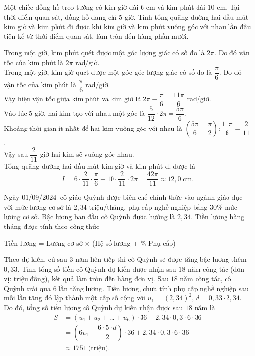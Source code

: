 \begin{ex}%
Một chiếc đồng hồ treo tường có kim giờ dài $6$ cm và kim phút dài $10$ cm. Tại thời điểm quan sát, đồng hồ đang chỉ $5$ giờ. Tính tổng quãng đường hai đầu mút kim giờ và kim phút đi được khi kim giờ và kim phút vuông góc với nhau lần đầu tiên kể từ thời điểm quan sát, làm tròn đến hàng phần mười.
	\loigiai
	{Trong một giờ, kim phút quét được một góc lượng giác có số đo là $2 \pi$. Do đó vận tốc của kim phút là $2 \pi$ rad/giờ.\\
	Trong một giờ, kim giờ quét được một góc góc lượng giác có số đo là $\dfrac{\pi}{6}$. Do đó vận tốc của kim phút là $\dfrac{\pi}{6}$ rad/giờ.\\
	Vậy hiệu vận tốc giữa kim phút và kim giờ là $2 \pi -\dfrac{\pi}{6}=\dfrac{11 \pi}{6}$ rad/giờ.\\
	Vào lúc $5$ giờ, hai kim tạo với nhau một góc là $\dfrac{5}{12} \cdot 2 \pi =\dfrac{5 \pi}{6}$.\\
	Khoảng thời gian ít nhất để hai kim vuông góc với nhau là $\left(\dfrac{5 \pi}{6}-\dfrac{\pi}{2}\right) : \dfrac{11 \pi}{6}=\dfrac{2}{11}$.\\
	Vậy sau $\dfrac{2}{11}$ giờ hai kim sẽ vuông góc nhau.\\
	Tổng quãng đường hai đầu mút kim giờ và kim phút đi được là $$I=6 \cdot \dfrac{2}{11} \cdot \dfrac{\pi}{6}+10 \cdot \dfrac{2}{11} \cdot 2 \pi = \dfrac{42 \pi}{11} \approx 12{,}0 \; \text{cm}.$$
	
	}
\end{ex}
\begin{ex}%
Ngày 01/09/2024, cô giáo Quỳnh được biên chế chính thức vào ngành giáo dục với mức lương cơ sở là $2{,}34$ triệu/tháng, phụ cấp nghề nghiệp bằng $30\%$ mức lương cơ sở. Bậc lương ban đầu cô Quỳnh được hưởng là $2{,}34$. Tiền lương hàng tháng được tính theo công thức
\begin{center}
	Tiền lương = Lương cơ sở $\times$ (Hệ số lương + $\%$ Phụ cấp)
\end{center}
Theo dự kiến, cứ sau $3$ năm liên tiếp thì cô Quỳnh sẽ được tăng bậc lương thêm $0{,}33$. Tính tổng số tiền cô Quỳnh dự kiến được nhận sau $18$ năm công tác (đơn vị: triệu đồng), kết quả làm tròn đến hàng đơn vị.
	\loigiai
	{Sau $18$ năm công tác, cô Quỳnh trải qua $6$ lần tăng lương. Tiền lương, chưa tính phụ cấp nghề nghiệp sau mỗi lần tăng đó lập thành một cấp số cộng với $u_1=(2{,}34)^2$, $d = 0{,}33 \cdot 2{,}34$.\\
	Do đó, tổng số tiền lương cô Quỳnh dự kiến nhận được sau $18$ năm là 
	\begin{align*}
		S&=(u_1+u_2+\ldots+u_6) \cdot 36+ 2{,}34 \cdot 0{,}3 \cdot 6 \cdot 36\\
		&=\left(6u_1+\dfrac{6 \cdot 5 \cdot d}{2}\right) \cdot 36+ 2{,}34 \cdot 0{,}3 \cdot 6 \cdot 36\\
		&\approx 1751 \; \text{(triệu).}
	\end{align*}
	}
\end{ex}
